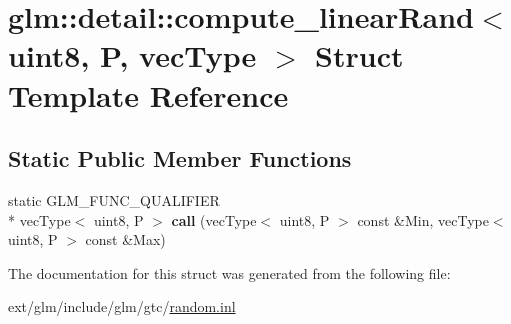 \hypertarget{structglm_1_1detail_1_1compute__linear_rand_3_01uint8_00_01_p_00_01vec_type_01_4}{\section{glm\-:\-:detail\-:\-:compute\-\_\-linear\-Rand$<$ uint8, P, vec\-Type $>$ Struct Template Reference}
\label{structglm_1_1detail_1_1compute__linear_rand_3_01uint8_00_01_p_00_01vec_type_01_4}
}
\subsection*{Static Public Member Functions}
\begin{DoxyCompactItemize}
\item 
\hypertarget{structglm_1_1detail_1_1compute__linear_rand_3_01uint8_00_01_p_00_01vec_type_01_4_aee2b1e5fe6b54c1765ba8051bcd37cfe}{static G\-L\-M\-\_\-\-F\-U\-N\-C\-\_\-\-Q\-U\-A\-L\-I\-F\-I\-E\-R \\*
vec\-Type$<$ uint8, P $>$ {\bfseries call} (vec\-Type$<$ uint8, P $>$ const \&Min, vec\-Type$<$ uint8, P $>$ const \&Max)}\label{structglm_1_1detail_1_1compute__linear_rand_3_01uint8_00_01_p_00_01vec_type_01_4_aee2b1e5fe6b54c1765ba8051bcd37cfe}

\end{DoxyCompactItemize}


The documentation for this struct was generated from the following file\-:\begin{DoxyCompactItemize}
\item 
ext/glm/include/glm/gtc/\hyperlink{random_8inl}{random.\-inl}\end{DoxyCompactItemize}

